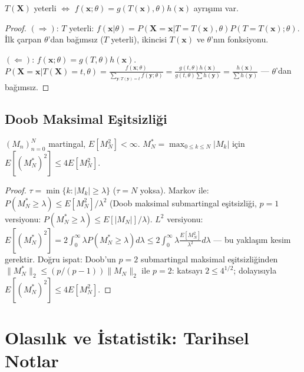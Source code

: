 \begin{teorem}
$T(\mathbf{X})$ yeterli $\iff$ $f(\mathbf{x};\theta)=g(T(\mathbf{x}),\theta)h(\mathbf{x})$ ayrışımı var.
\end{teorem}
\begin{proof}
$(\Rightarrow)$: $T$ yeterli: $f(\mathbf{x}|\theta)=P(\mathbf{X}=\mathbf{x}|T=T(\mathbf{x}),\theta)P(T=T(\mathbf{x});\theta)$. İlk çarpan $\theta$'dan bağımsız ($T$ yeterli), ikincisi $T(\mathbf{x})$ ve $\theta$'nın fonksiyonu.

$(\Leftarrow)$: $f(\mathbf{x};\theta)=g(T,\theta)h(\mathbf{x})$. $P(\mathbf{X}=\mathbf{x}|T(\mathbf{X})=t,\theta)=\frac{f(\mathbf{x};\theta)}{\sum_{\mathbf{y}:T(\mathbf{y})=t}f(\mathbf{y};\theta)}=\frac{g(t,\theta)h(\mathbf{x})}{g(t,\theta)\sum h(\mathbf{y})}=\frac{h(\mathbf{x})}{\sum h(\mathbf{y})}$ --- $\theta$'dan bağımsız.
\end{proof}

\subsection{Doob Maksimal Eşitsizliği}

\begin{teorem}
$(M_n)_{n=0}^N$ martingal, $E[M_N^2]<\infty$. $M_N^*=\max_{0\leq k\leq N}|M_k|$ için $E[(M_N^*)^2]\leq 4E[M_N^2]$.
\end{teorem}
\begin{proof}
$\tau=\min\{k:|M_k|\geq\lambda\}$ ($\tau=N$ yoksa). Markov ile:
$P(M_N^*\geq\lambda)\leq E[M_N^2]/\lambda^2$ (Doob maksimal submartingal eşitsizliği, $p=1$ versiyonu: $P(M_N^*\geq\lambda)\leq E[|M_N|]/\lambda$).
$L^2$ versiyonu: $E[(M_N^*)^2]=2\int_0^\infty\lambda P(M_N^*\geq\lambda)d\lambda\leq 2\int_0^\infty\lambda\frac{E[M_N^2]}{\lambda^2}d\lambda$ --- bu yaklaşım kesim gerektir. Doğru ispat: Doob'un $p=2$ submartingal maksimal eşitsizliğinden $\|M_N^*\|_2\leq (p/(p-1))\|M_N\|_2$ ile $p=2$: katsayı $2\leq 4^{1/2}$; dolayısıyla $E[(M_N^*)^2]\leq 4E[M_N^2]$.
\end{proof}

\section{Olasılık ve İstatistik: Tarihsel Notlar}
\label{app:tarihsel}


